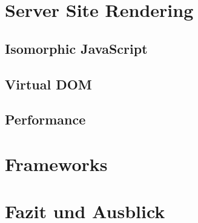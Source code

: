 \documentclass[runningheads]{llncs}
\begin{document}

\section{Server Site Rendering}
\label{sec:Server Site Rendering}

\subsection{Isomorphic JavaScript}
\label{subsec:Isomorphic JavaScript}

\subsection{Virtual DOM}
\label{subsec:Virtual DOM}

\subsection{Performance}
\label{subsec:Virtual DOM}

\section{Frameworks}
\label{sec:Evaluation}



\section{Fazit und Ausblick}
\label{sec:Fazit}



%

\newpage

\end{document}
